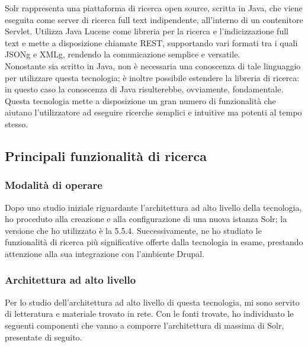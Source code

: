 		\gls{Solr} rappresenta una piattaforma di ricerca \gls{open source}, scritta in \gls{Java}, che viene eseguita come server di ricerca full text indipendente, all'interno di un contenitore \gls{Servlet}. Utilizza \gls{Java Lucene} come libreria per la ricerca e l'indicizzazione full text e mette a disposizione chiamate \gls{REST}, supportando vari formati tra i quali \gls{JSONg} e \gls{XMLg}, rendendo la comunicazione semplice e versatile. \\ Nonostante sia scritto in \gls{Java}, non è necessaria una conoscenza di tale linguaggio per utilizzare questa tecnologia; è inoltre possibile estendere la libreria di ricerca: in questo caso la conoscenza di \gls{Java} risulterebbe, ovviamente, fondamentale. \\
		Questa tecnologia mette a disposizione un gran numero di funzionalità che aiutano l'utilizzatore ad eseguire ricerche semplici e intuitive ma potenti al tempo stesso.
		
		\subsection{Principali funzionalità di ricerca}
		
			\subsubsection{Modalità di operare}
			Dopo uno studio iniziale riguardante l'architettura ad alto livello della tecnologia, ho proceduto alla creazione e alla configurazione di una nuova istanza \gls{Solr}; la versione che ho utilizzato è la 5.5.4. Successivamente, ne ho studiato le funzionalità di ricerca più significative offerte dalla tecnologia in esame, prestando attenzione alla sua integrazione con l'ambiente \gls{Drupal}.
			
			\subsubsection{Architettura ad alto livello}
			\label{solr:architettura_ad_alto_livello}
			Per lo studio dell'architettura ad alto livello di questa tecnologia, mi sono servito di letteratura e materiale trovato in rete. Con le fonti trovate, ho individuato le seguenti componenti che vanno a comporre l'architettura di massima di \gls{Solr}, presentate di seguito.
			
